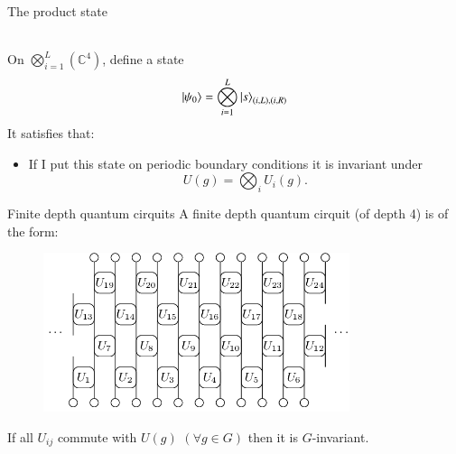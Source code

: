 \documentclass{beamer}
\newcommand{\CC}{\mathbb{C}}
\begin{document}
\begin{frame}{The product state}
	\\
	On $\bigotimes_{i=1}^L(\CC^4)$, define a state
	\begin{equation}
		\ket{\psi_0}=\bigotimes_{i=1}^L\ket{s}_{(i,L),(i,R)}
	\end{equation}
	\pause
	It satisfies that:
	\begin{itemize}
		\item If I put this state on periodic boundary conditions it is invariant under
		\begin{equation}
			U(g)=\bigotimes_i U_i(g).
		\end{equation}
	\end{itemize}
\end{frame}

\begin{frame}{Finite depth quantum cirquits}
	A finite depth quantum cirquit (of depth 4) is of the form:
	\begin{figure}
		\center
		\includegraphics[width=0.8\textwidth]{FiniteDepthQuantumCirquit2.png}
	\end{figure}
	If all $U_{ij}$ commute with $U(g)$ $(\forall g\in G)$ then it is $G$-invariant.
\end{frame}
\end{document}
